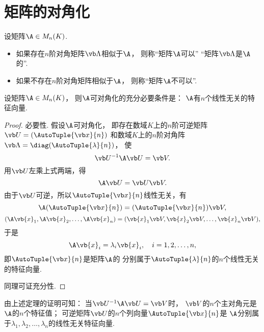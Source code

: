 \section{矩阵的对角化}
\begin{definition}
设矩阵\(\A \in M_n(K)\).
\begin{itemize}
	\item 如果存在\(n\)阶对角矩阵\(\vb\Lambda\)相似于\(\A\)，
	则称“矩阵\(\A\)可以”
	“矩阵\(\vb\Lambda\)是\(\A\)的”.
	\item 如果不存在\(n\)阶对角矩阵相似于\(\A\)，
	则称“矩阵\(\A\)不可以”.
\end{itemize}
\end{definition}

\begin{theorem}[矩阵可对角化的充分必要条件]\label{theorem:矩阵可对角化的充分必要条件.定理1}
设矩阵\(\A \in M_n(K)\)，
则\(\A\)可对角化的充分必要条件是：
\(\A\)有\(n\)个线性无关的特征向量.
\begin{proof}
必要性.
假设\(\A\)可对角化，
即存在数域\(K\)上的\(n\)阶可逆矩阵\(\P=(\AutoTuple{\x}{n})\)
和数域\(K\)上的\(n\)阶对角阵\(\vb\Lambda=\diag(\AutoTuple{\lambda}{n})\)，
使\[
	\P^{-1}\A\P=\V.
\]
用\(\P\)左乘上式两端，得\[
	\A\P=\P\V.
\]
由于\(\P\)可逆，所以\(\AutoTuple{\x}{n}\)线性无关，有\[
	\A(\AutoTuple{\x}{n})=(\AutoTuple{\x}{n})\V,
\]\[
	(\A\vb{x}_1,\A\vb{x}_2,\dotsc,\A\vb{x}_n)=(\vb{x}_1\V,\vb{x}_2\V,\dotsc,\vb{x}_n\V),
\]
于是\[
	\A\vb{x}_i=\lambda_i\vb{x}_i,
	\quad i=1,2,\dotsc,n,
\]
即\(\AutoTuple{\x}{n}\)是矩阵\(\A\)的
分别属于\(\AutoTuple{\lambda}{n}\)的\(n\)个线性无关的特征向量.

同理可证充分性.
\end{proof}
\end{theorem}

由上述定理的证明可知：
{\color{red}当\(\P^{-1}\A\P=\V\)时，
\(\V\)的\(n\)个主对角元是\(\A\)的\(n\)个特征值；
可逆矩阵\(\P\)的\(n\)个列向量\(\AutoTuple{\x}{n}\)是
\(\A\)分别属于\(\lambda_1,\lambda_2,\dotsc,\lambda_n\)的线性无关特征向量.}

